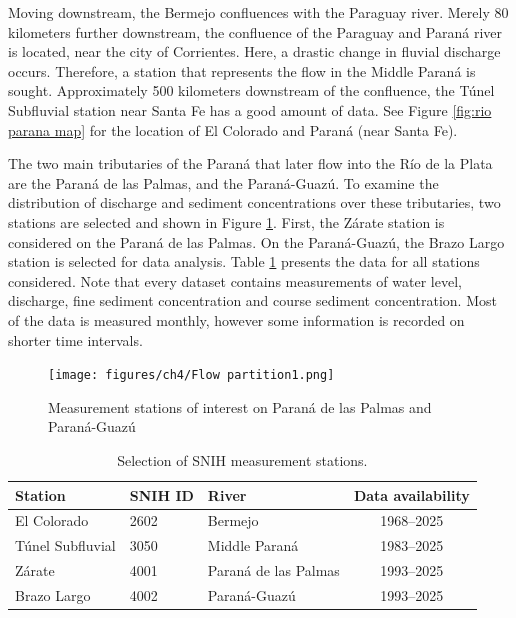 Moving downstream, the Bermejo confluences with the Paraguay river. Merely 80 kilometers further downstream, the confluence of the Paraguay and Paraná river is located, near the city of Corrientes. Here, a drastic change in fluvial discharge occurs. Therefore, a station that represents the flow in the Middle Paraná is sought. Approximately 500 kilometers downstream of the confluence, the Túnel Subfluvial station near Santa Fe has a good amount of data. See Figure \ref{fig:rio parana map} for the location of El Colorado and Paraná (near Santa Fe). 

The two main tributaries of the Paraná that later flow into the Río de la Plata are the Paraná de las Palmas, and the Paraná-Guazú. To examine the distribution of discharge and sediment concentrations over these tributaries, two stations are selected and shown in Figure \ref{fig:flow partition}. First, the Zárate station is considered on the Paraná de las Palmas. On the Paraná-Guazú, the Brazo Largo station is selected for data analysis. Table \ref{tab:stations data collection} presents the data for all stations considered. Note that every dataset contains measurements of water level, discharge, fine sediment concentration and course sediment concentration. Most of the data is measured monthly, however some information is recorded on shorter time intervals. 


\begin{figure}
    \centering
    \texttt{[image: figures/ch4/Flow partition1.png]}
    \caption{Measurement stations of interest on Paraná de las Palmas and Paraná-Guazú}
    \label{fig:flow partition}
\end{figure}



\begin{table}[H]
    \centering
    \renewcommand{\arraystretch}{1.2} %
    \setlength{\tabcolsep}{8pt}       %
    \begin{tabular}{lllc}
        \toprule
        \textbf{Station} & \textbf{SNIH ID} & \textbf{River} & \textbf{Data availability} \\
        \midrule
        El Colorado         & 2602 & Bermejo               & 1968--2025 \\
        Túnel Subfluvial    & 3050 & Middle Paraná         & 1983--2025 \\
        Zárate              & 4001 & Paraná de las Palmas  & 1993--2025 \\
        Brazo Largo         & 4002 & Paraná-Guazú          & 1993--2025 \\
        \bottomrule
    \end{tabular}
    \caption{Selection of SNIH measurement stations.}
    \label{tab:stations data collection}
\end{table}



